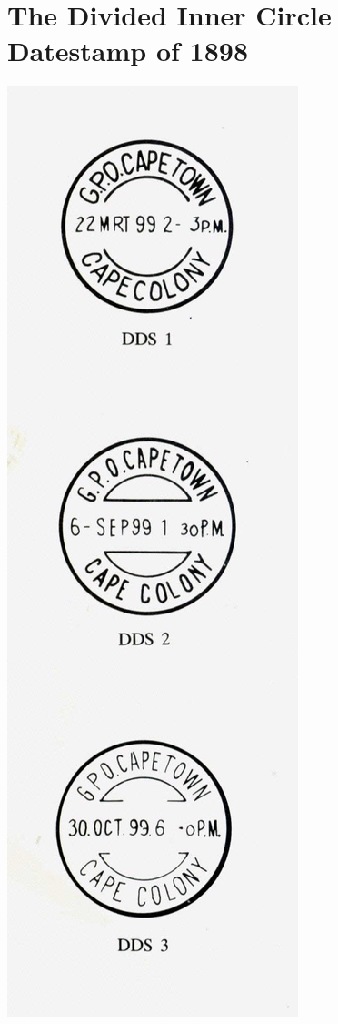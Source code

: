 \section{The Divided Inner Circle Datestamp of 1898}

\begin{marginfigure}
\centering
\includegraphics[width=.80\textwidth]{../cape-of-good-hope/Divided-Inner-Circle/Postmarks.jpg}
\caption{ }
\end{marginfigure}  	 


